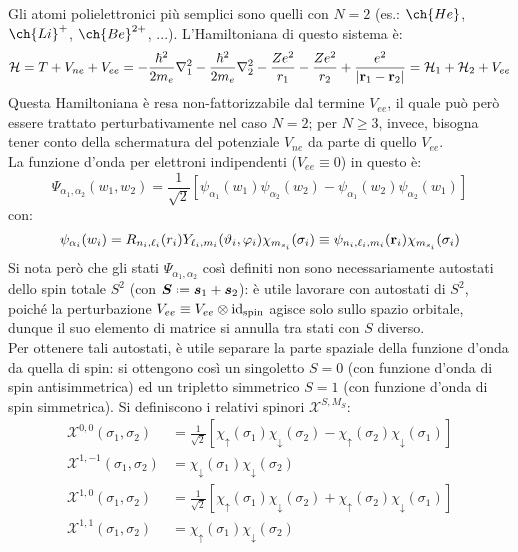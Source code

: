 Gli atomi polielettronici più semplici sono quelli con $ N = 2 $ (es.: $ \ch{He} $, $ \ch{Li}^+ $, $ \ch{Be}^{2+} $, ...). L'Hamiltoniana di questo sistema è:
\begin{equation*}
	\mathcal{H} = T + V_{ne} + V_{ee} = - \frac{\hbar^2}{2m_e} \nabla^2_1 - \frac{\hbar^2}{2m_e} \nabla^2_2 - \frac{Ze^2}{r_1} - \frac{Ze^2}{r_2} + \frac{e^2}{\left\lvert\mathbf{r}_1 - \mathbf{r}_2\right\rvert} = \mathcal{H}_1 + \mathcal{H}_2 + V_{ee}
\end{equation*}
Questa Hamiltoniana è resa non-fattorizzabile dal termine $ V_{ee} $, il quale può però essere trattato perturbativamente nel caso $ N = 2 $; per $ N \ge 3 $, invece, bisogna tener conto della schermatura del potenziale $ V_{ne} $ da parte di quello $ V_{ee} $. \\
La funzione d'onda per elettroni indipendenti ($ V_{ee} \equiv 0 $) in questo è:
\begin{equation*}
	\Psi_{\alpha_1 , \alpha_2}(w_1 , w_2) = \frac{1}{\sqrt{2}} \left[ \psi_{\alpha_1}(w_1) \psi_{\alpha_2}(w_2) - \psi_{\alpha_1}(w_2) \psi_{\alpha_2}(w_1) \right]
\end{equation*}
con:
\begin{equation*}
	\psi_{\alpha_i}(w_i) = R_{n_i, \ell_i}(r_i) Y_{\ell_i, m_i}(\vartheta_i, \varphi_i) \chi_{m_{s_i}}(\sigma_i) \equiv \psi_{n_i, \ell_i, m_i}(\mathbf{r}_i) \chi_{m_{s_i}}(\sigma_i)
\end{equation*}
Si nota però che gli stati $ \Psi_{\alpha_1, \alpha_2} $ così definiti non sono necessariamente autostati dello spin totale $ S^2 $ (con $ \bs{S} \defeq \bs{s}_1 + \bs{s}_2 $): è utile lavorare con autostati di $ S^2 $, poiché la perturbazione $ V_{ee} \equiv V_{ee} \otimes \operatorname{id}_\text{spin} $ agisce solo sullo spazio orbitale, dunque il suo elemento di matrice si annulla tra stati con $ S $ diverso. \\
Per ottenere tali autostati, è utile separare la parte spaziale della funzione d'onda da quella di spin: si ottengono così un singoletto $ S = 0 $ (con funzione d'onda di spin antisimmetrica) ed un tripletto simmetrico $ S = 1 $ (con funzione d'onda di spin simmetrica). Si definiscono i relativi spinori $ \mathcal{X}^{S,M_S} $:
\begin{align*}
	\mathcal{X}^{0,0}(\sigma_1, \sigma_2) &= \frac{1}{\sqrt{2}} \left[ \chi_\uparrow(\sigma_1) \chi_\downarrow(\sigma_2) - \chi_\uparrow(\sigma_2) \chi_\downarrow(\sigma_1) \right] \\
	\mathcal{X}^{1,-1}(\sigma_1, \sigma_2) &= \chi_\downarrow(\sigma_1) \chi_\downarrow(\sigma_2) \\
	\mathcal{X}^{1,0}(\sigma_1, \sigma_2) &= \frac{1}{\sqrt{2}} \left[ \chi_\uparrow(\sigma_1) \chi_\downarrow(\sigma_2) + \chi_\uparrow(\sigma_2) \chi_\downarrow(\sigma_1) \right] \\
	\mathcal{X}^{1,1}(\sigma_1, \sigma_2) &= \chi_\uparrow(\sigma_1) \chi_\downarrow(\sigma_2)
\end{align*}
